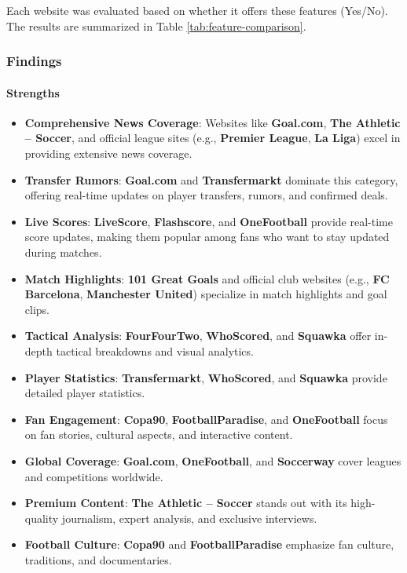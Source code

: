 Each website was evaluated based on whether it offers these features (Yes/No). The results are summarized in Table \ref{tab:feature-comparison}.

\subsubsection{Findings}

\paragraph{Strengths}
\begin{itemize}
    \item \textbf{Comprehensive News Coverage}: Websites like \textbf{Goal.com}, \textbf{The Athletic – Soccer}, and official league sites (e.g., \textbf{Premier League}, \textbf{La Liga}) excel in providing extensive news coverage.
    \item \textbf{Transfer Rumors}: \textbf{Goal.com} and \textbf{Transfermarkt} dominate this category, offering real-time updates on player transfers, rumors, and confirmed deals.
    \item \textbf{Live Scores}: \textbf{LiveScore}, \textbf{Flashscore}, and \textbf{OneFootball} provide real-time score updates, making them popular among fans who want to stay updated during matches.
    \item \textbf{Match Highlights}: \textbf{101 Great Goals} and official club websites (e.g., \textbf{FC Barcelona}, \textbf{Manchester United}) specialize in match highlights and goal clips.
    \item \textbf{Tactical Analysis}: \textbf{FourFourTwo}, \textbf{WhoScored}, and \textbf{Squawka} offer in-depth tactical breakdowns and visual analytics.
    \item \textbf{Player Statistics}: \textbf{Transfermarkt}, \textbf{WhoScored}, and \textbf{Squawka} provide detailed player statistics.
    \item \textbf{Fan Engagement}: \textbf{Copa90}, \textbf{FootballParadise}, and \textbf{OneFootball} focus on fan stories, cultural aspects, and interactive content.
    \item \textbf{Global Coverage}: \textbf{Goal.com}, \textbf{OneFootball}, and \textbf{Soccerway} cover leagues and competitions worldwide.
    \item \textbf{Premium Content}: \textbf{The Athletic – Soccer} stands out with its high-quality journalism, expert analysis, and exclusive interviews.
    \item \textbf{Football Culture}: \textbf{Copa90} and \textbf{FootballParadise} emphasize fan culture, traditions, and documentaries.
\end{itemize}

